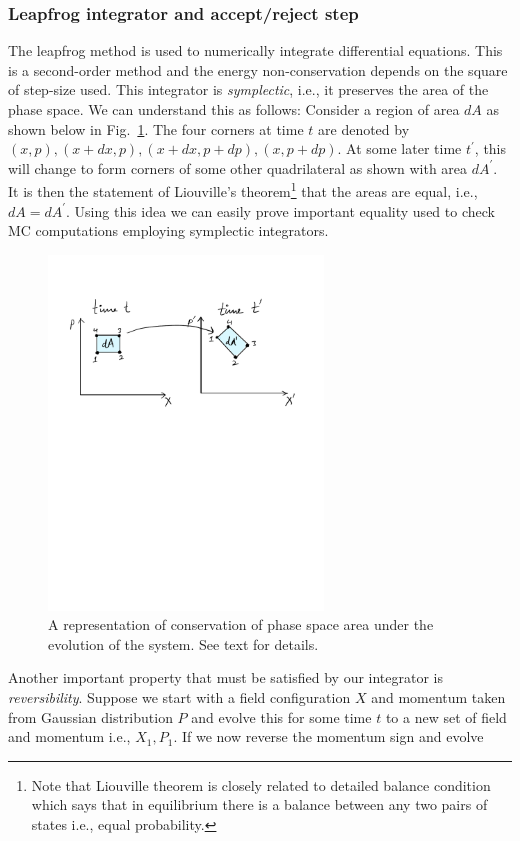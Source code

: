 \documentclass[letter,11pt]{article}
\begin{document}
\subsubsection{Leapfrog integrator and accept/reject step}
The leapfrog method is used to numerically integrate differential equations. This is a second-order 
method and the energy non-conservation depends on the square of step-size used. 
This integrator is \emph{symplectic}, i.e., it preserves the 
area of the phase space. 
We can understand this as follows: 
Consider a region of area $dA$ as shown below in Fig.~\ref{fig:PSP1}. The four corners at time $t$ are denoted by $(x, p), (x+dx, p), (x+dx, p+dp),(x, p+dp)$. At some later time $t^{\prime}$, this will change to form corners of some other quadrilateral as shown with area $dA^{\prime}$. It is then the statement of Liouville's theorem\footnote{Note that Liouville theorem is closely related to detailed balance condition which says that in equilibrium there is a balance between any two pairs of states i.e., equal probability.} that the areas are equal, i.e., $dA = dA^{\prime}$. Using this idea we can easily prove important equality used to check MC computations employing symplectic integrators.
\begin{figure}[htbp] 
	\centering 
	\includegraphics[width=0.65\textwidth]{figs/PSP.pdf}
	\caption{\label{fig:PSP1}A representation of conservation of phase space area under the evolution of the system. See text for details.}
\end{figure} 
Another important property that must be satisfied by our integrator is \emph{reversibility}. Suppose we start with a field configuration $X$ and momentum taken from Gaussian distribution $P$ and evolve this for some time $t$ to a new set of field and momentum i.e., $X_{1},P_{1}$. If we now reverse the momentum sign and evolve 
\end{document}
